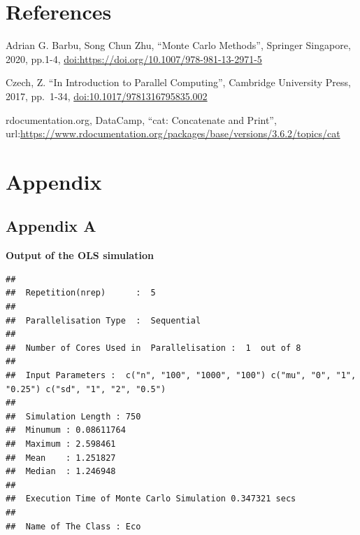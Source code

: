 \documentclass[11pt,a4paper]{article}
\begin{document}
\pagebreak

\hypertarget{references}{%
\section{References}\label{references}}

Adrian G. Barbu, Song Chun Zhu, ``Monte Carlo Methods'', Springer
Singapore, 2020, pp.1-4,
\url{doi:https://doi.org/10.1007/978-981-13-2971-5}

Czech, Z. ``In Introduction to Parallel Computing'', Cambridge
University Press, 2017, pp.~1-34, \url{doi:10.1017/9781316795835.002}

rdocumentation.org, DataCamp, ``cat: Concatenate and Print'',
url:\url{https://www.rdocumentation.org/packages/base/versions/3.6.2/topics/cat}

\pagebreak

\hypertarget{appendix}{%
\section{Appendix}\label{appendix}}

\hypertarget{appendix-a}{%
\subsection{Appendix A}\label{appendix-a}}

\textbf{Output of the OLS simulation}

\begin{verbatim}
## 
##  Repetition(nrep)      :  5 
## 
##  Parallelisation Type  :  Sequential 
## 
##  Number of Cores Used in  Parallelisation :  1  out of 8 
## 
##  Input Parameters :  c("n", "100", "1000", "100") c("mu", "0", "1", "0.25") c("sd", "1", "2", "0.5") 
## 
##  Simulation Length : 750 
##  Minumum : 0.08611764 
##  Maximum : 2.598461 
##  Mean    : 1.251827 
##  Median  : 1.246948 
## 
##  Execution Time of Monte Carlo Simulation 0.347321 secs 
## 
##  Name of The Class : Eco
\end{verbatim}
\end{document}
